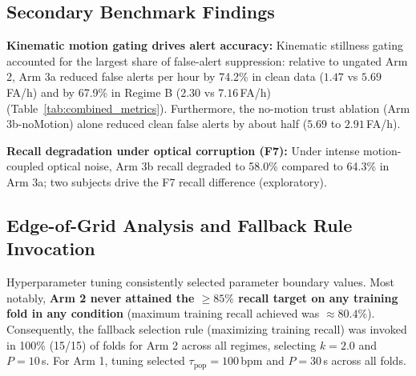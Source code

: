 \documentclass[conference]{IEEEtran}
\begin{document}
\subsection{Secondary Benchmark Findings}

\textbf{Kinematic motion gating drives alert accuracy:} Kinematic stillness gating accounted for the largest share of false-alert suppression: relative to ungated Arm 2, Arm 3a reduced false alerts per hour by 74.2\% in clean data ($1.47$ vs $5.69$\,FA/h) and by 67.9\% in Regime B ($2.30$ vs $7.16$\,FA/h) (Table~\ref{tab:combined_metrics}). Furthermore, the no-motion trust ablation (Arm 3b-noMotion) alone reduced clean false alerts by about half ($5.69$ to $2.91$\,FA/h).

\textbf{Recall degradation under optical corruption (F7):} Under intense motion-coupled optical noise, Arm 3b recall degraded to 58.0\% compared to 64.3\% in Arm 3a; two subjects drive the F7 recall difference (exploratory).

\subsection{Edge-of-Grid Analysis and Fallback Rule Invocation}
Hyperparameter tuning consistently selected parameter boundary values. Most notably, \textbf{Arm 2 never attained the $\ge 85\%$ recall target on any training fold in any condition} (maximum training recall achieved was $\approx 80.4\%$). Consequently, the fallback selection rule (maximizing training recall) was invoked in 100\% (15/15) of folds for Arm 2 across all regimes, selecting $k = 2.0$ and $P = 10$\,s. For Arm 1, tuning selected $\tau_{\text{pop}} = 100$\,bpm and $P = 30$\,s across all folds.
\end{document}
